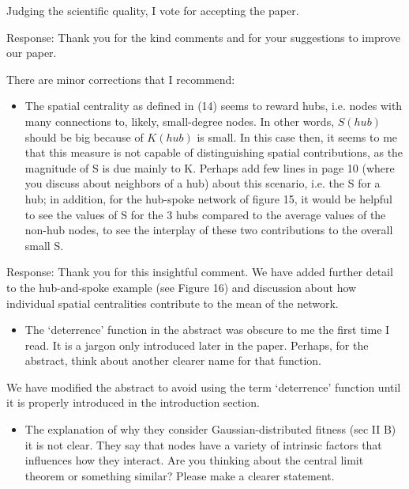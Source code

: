 \documentclass[12pt]{article}
\begin{document}
Judging the scientific quality, I vote for accepting the paper.

{\color{res} Response: Thank you for the kind comments and for your suggestions to improve our paper. }

There are minor corrections that I recommend:

\begin{itemize}
\item The spatial centrality as defined in (14) seems to reward hubs, i.e. nodes with many
connections to, likely, small-degree nodes. In other words, $S(hub)$ should be big
because of $K(hub)$ is small. In this case then, it seems to me that this measure is not
capable of distinguishing spatial contributions, as the magnitude of S is due mainly
to K. Perhaps add few lines in page 10 (where you discuss about neighbors of a hub)
about this scenario, i.e. the S for a hub; in addition, for the hub-spoke network of
figure 15, it would be helpful to see the values of S for the 3 hubs compared to the
average values of the non-hub nodes, to see the interplay of these two contributions to
the overall small S.
\end{itemize}

{\color{res} Response: Thank you for this insightful comment. We have added further detail to the hub-and-spoke example (see Figure 16) and discussion about how individual spatial centralities contribute to the mean of the network.}

\begin{itemize}
\item The `deterrence’ function in the abstract was obscure to me the first time I read. It
is a jargon only introduced later in the paper. Perhaps, for the abstract, think about
another clearer name for that function.
\end{itemize}

{\color{res} We have modified the abstract to avoid using the term `deterrence' function until it is properly introduced in the introduction section.}

\begin{itemize}
\item The explanation of why they consider Gaussian-distributed fitness (sec II B) it is not
clear. They say that nodes have a variety of intrinsic factors that influences how
they interact. Are you thinking about the central limit theorem or something similar?
Please make a clearer statement.
\end{itemize}
\end{document}
